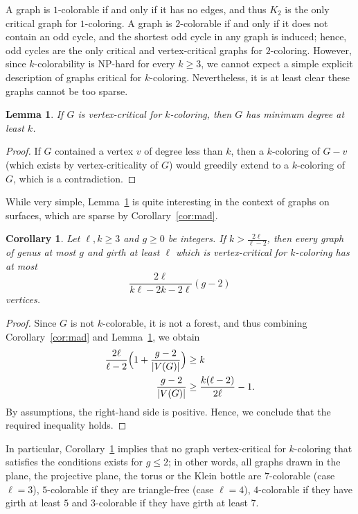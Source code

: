 \documentclass[12pt,twoside,openright,a4paper]{book}
\newtheorem{lemma}[theorem]{Lemma}
\newtheorem{corollary}[theorem]{Corollary}
\begin{document}
A graph is $1$-colorable if and only if it has no edges, and thus $K_2$ is the only critical graph for $1$-coloring.
A graph is $2$-colorable if and only if it does not contain an odd cycle, and the shortest odd cycle in any graph is induced;
hence, odd cycles are the only critical and vertex-critical graphs for $2$-coloring.  However, since $k$-colorability
is NP-hard for every $k\ge 3$, we cannot expect a simple explicit description of graphs critical for $k$-coloring.  Nevertheless,
it is at least clear these graphs cannot be too sparse.
\begin{lemma}\label{lemma:crmindeg}
If $G$ is vertex-critical for $k$-coloring, then $G$ has minimum degree at least $k$.
\end{lemma}
\begin{proof}
If $G$ contained a vertex $v$ of degree less than $k$, then a $k$-coloring of $G-v$ (which exists
by vertex-criticality of $G$) would greedily extend to a $k$-coloring of $G$, which is a contradiction.
\end{proof}
While very simple, Lemma~\ref{lemma:crmindeg} is quite interesting in the context of graphs on surfaces,
which are sparse by Corollary~\ref{cor:mad}.

\begin{corollary}\label{cor:small-simple}
Let $\ell,k\ge 3$ and $g\ge 0$ be integers.  If $k>\tfrac{2\ell}{\ell-2}$, then every graph of genus at most $g$ and girth at least $\ell$
which is vertex-critical for $k$-coloring has at most $$\frac{2\ell}{k\ell-2k-2\ell}(g-2)$$ vertices.
\end{corollary}
\begin{proof}
Since $G$ is not $k$-colorable, it is not a forest, and thus combining Corollary~\ref{cor:mad} and Lemma~\ref{lemma:crmindeg},
we obtain
\begin{align*}
\frac{2\ell}{\ell-2}\Bigl(1+\frac{g-2}{|V(G)|}\Bigr)&\ge k\\
\frac{g-2}{|V(G)|}&\ge \frac{k(\ell-2)}{2\ell}-1.
\end{align*}
By assumptions, the right-hand side is positive.  Hence, we conclude that 
the required inequality holds.
\end{proof}
In particular, Corollary~\ref{cor:small-simple} implies that no graph vertex-critical for $k$-coloring that satisfies
the conditions exists for $g\le 2$; in other words, all graphs drawn in the plane, the projective plane, the torus
or the Klein bottle are $7$-colorable (case $\ell=3$), $5$-colorable if they are triangle-free (case $\ell=4$),
$4$-colorable if they have girth at least $5$ and $3$-colorable if they have girth at least $7$.
\end{document}
